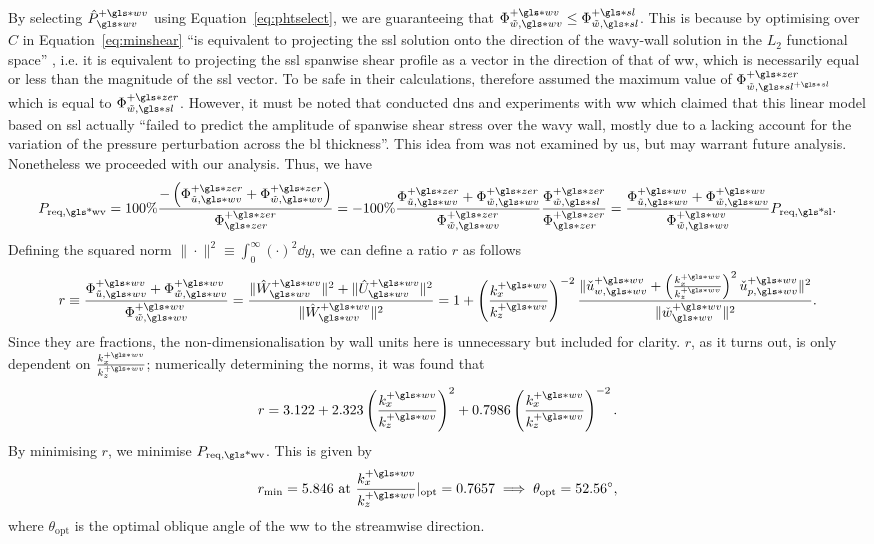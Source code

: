 By selecting  $\hat{P}\ww\pw$ using Equation~\eqref{eq:phtselect}, we are guaranteeing that $\Phi _{\tilde{w},\gls*{wv}}\pw\leq\Phi _{\tilde{w},\gls*{sl}}\ps$. This is because by optimising over $C$ in Equation~\eqref{eq:minshear} ``is equivalent to projecting the \gls*{ssl} solution onto the direction of the wavy-wall solution in the $L_2$ functional space'' \cite{chernyshenko2013}, i.e. it is equivalent to projecting the \gls*{ssl} spanwise shear profile as a vector in the direction of that of \gls*{ww}, which is necessarily equal or less than the magnitude of the \gls*{ssl} vector. To be safe in their calculations, \textcite{chernyshenko2013} therefore assumed the maximum value of $\Phi _{\tilde{w},\gls*{sl}\ps}\pz$ which is equal to $\Phi _{\tilde{w},\gls*{sl}}\pz$. However, it must be noted that \textcite{denison2015} conducted \gls*{dns} and experiments with \gls*{ww} which claimed that this linear model based on \gls*{ssl} actually ``failed to predict the amplitude of spanwise shear stress over the wavy wall, mostly due to a lacking account for the variation of the pressure perturbation across the \gls*{bl} thickness''. This idea from \textcite{denison2015} was not examined by us, but may warrant future analysis. Nonetheless we proceeded with our analysis. Thus, we have
\begin{equation}
	P_\text{req,\gls*{wv}} = 100\% \frac{-\left(\Phi _{\tilde{u},\gls*{wv}}\pz+\Phi _{\tilde{w},\gls*{wv}}\pz\right)}{\Phi \zz\pz}
	= -100\% \frac{\Phi _{\tilde{u},\gls*{wv}}\pz+\Phi _{\tilde{w},\gls*{wv}}\pz}{\Phi _{\tilde{w},\gls*{wv}}\pz}\frac{\Phi _{\tilde{w},\gls*{sl}}\pz}{\Phi \zz\pz}
	= \frac{\Phi _{\tilde{u},\gls*{wv}}\pw+\Phi _{\tilde{w},\gls*{wv}}\pw}{\Phi _{\tilde{w},\gls*{wv}}\pw}P_\text{req,\gls*{sl}}
.\end{equation}
Defining the squared norm $\|\cdot\|^2\equiv \int_{0}^{\infty} \left( \cdot \right) ^{2} \dd{y}  $, we can define a ratio $r$ as follows
\begin{equation}
	r\equiv\frac{\Phi _{\tilde{u},\gls*{wv}}\pw+\Phi _{\tilde{w},\gls*{wv}}\pw}{\Phi _{\tilde{w},\gls*{wv}}\pw}=\frac{\|\hat{W}\pw\ww\|^2+\|\hat{U}\pw\ww\|^2}{\|\hat{W}\pw\ww\|^2}=1+\left( \frac{k_x\pw}{k_z\pw} \right) ^{-2} \frac{\|\check{u}_{w,\gls*{wv}}\pw+\left( \frac{k_x\pw}{k_z\pw} \right) ^2 \check{u}_{p,\gls*{wv}}\pw\|^2}{\|\check{w}\ww\pw\|^2}
.\end{equation}
Since they are fractions, the non-dimensionalisation by wall units here is unnecessary but included for clarity. $r$, as it turns out, is only dependent on $\frac{k_x\pw}{k_z\pw}$; numerically determining the norms, it was found that
\begin{equation}
	r=3.122+2.323 \left( \frac{k_x\pw}{k_z\pw} \right) ^2+0.7986 \left( \frac{k_x\pw}{k_z\pw} \right) ^{-2} 
.\end{equation}
By minimising $r$, we minimise $P_\text{req,\gls*{wv}} $. This is given by
\begin{equation}
	r_\text{min} =5.846 \text{ at } \frac{k_x\pw}{k_z\pw}\rvert_\text{opt} = 0.7657 \implies \theta_\text{opt} = \ang{52.56}
,\end{equation}
where $\theta_\text{opt} $ is the optimal oblique angle of the \gls*{ww} to the streamwise direction.

